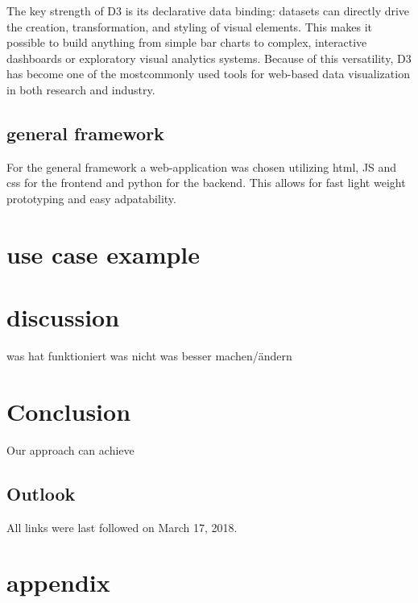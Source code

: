 \documentclass[
  a4paper,  %
  twoside,  %
  bibliography=totoc,
  headsepline,
  cleardoublepage=empty,
  parskip=half,
  draft=false
]{scrbook}
\begin{document}
The key strength of D3 is its declarative data binding: datasets can directly drive the creation, transformation, and styling of visual elements. This makes it possible to build anything from simple bar charts to complex, interactive dashboards or exploratory visual analytics systems. Because of this versatility, D3 has become one of the mostcommonly used tools for web-based data visualization in both research and industry.

\section{general framework}
For the general framework a web-application was chosen utilizing html, JS and css for the frontend and python for the backend.
This allows for fast light weight prototyping and easy adpatability. 
\chapter{use case example}
\chapter{discussion}
was hat funktioniert was nicht was besser machen/ändern
\chapter{Conclusion}
\label{chap:zusfas}
Our approach can achieve 

\section*{Outlook}

\printbibliography

All links were last followed on March 17, 2018.

\appendix
%
\chapter{appendix}
\end{document}
